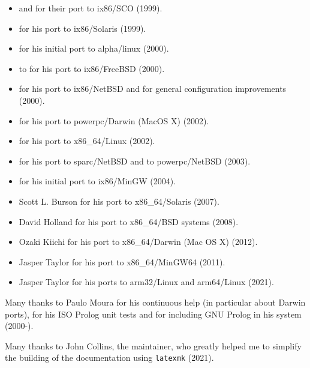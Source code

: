 \begin{itemize}

\item {} and
 for their port to
ix86/SCO (1999).

\item {} for
his port to ix86/Solaris (1999).

\item {} for his initial port to
alpha/linux (2000).

\item {} to for his port to
ix86/FreeBSD (2000).

\item {} for his port to
ix86/NetBSD and for general configuration improvements (2000).

\item {} for his port to
powerpc/Darwin (MacOS X) (2002).

\item {} for his port to
x86\_64/Linux (2002).

\item {} for his port to
sparc/NetBSD and to powerpc/NetBSD (2003).

\item {} for his initial port to
ix86/MinGW (2004).

\item {} {Scott L. Burson} for his port to x86\_64/Solaris (2007).

\item {} {David Holland} for his port to x86\_64/BSD systems (2008).

\item {} {Ozaki Kiichi} for his port to x86\_64/Darwin (Mac OS X) (2012).

\item {} {Jasper Taylor} for his port to x86\_64/MinGW64 (2011).

\item {} {Jasper Taylor} for his ports to arm32/Linux and arm64/Linux (2021).

\end{itemize}

Many thanks to Paulo Moura for his continuous help (in particular
about Darwin ports), for his ISO Prolog unit tests and for including
GNU Prolog in his  system (2000-).

Many thanks to John Collins, the
 maintainer, who greatly
helped me to simplify the building of the documentation using
\texttt{latexmk} (2021).


